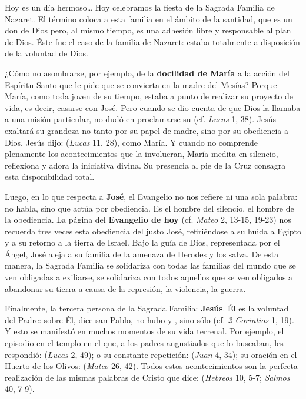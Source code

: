 				\begin{body}
					Hoy es un día hermoso\ldots{} Hoy celebramos la fiesta de la Sagrada Familia de Nazaret. El término  coloca a esta familia en el ámbito de la santidad, que es un don de Dios pero, al mismo tiempo, es una adhesión libre y responsable al plan de Dios. Éste fue el caso de la familia de Nazaret: estaba totalmente a disposición de la voluntad de Dios.
					
					¿Cómo no asombrarse, por ejemplo, de la \textbf{docilidad de María} a la acción del Espíritu Santo que le pide que se convierta en la madre del Mesías? Porque María, como toda joven de su tiempo, estaba a punto de realizar su proyecto de vida, es decir, casarse con José. Pero cuando se dio cuenta de que Dios la llamaba a una misión particular, no dudó en proclamarse su  (cf. \emph{Lucas} 1, 38). Jesús exaltará su grandeza no tanto por su papel de madre, sino por su obediencia a Dios. Jesús dijo:  (\emph{Lucas} 11, 28), como María. Y cuando no comprende plenamente los acontecimientos que la involucran, María medita en silencio, reflexiona y adora la iniciativa divina. Su presencia al pie de la Cruz consagra esta disponibilidad total.
					
					Luego, en lo que respecta a \textbf{José}, el Evangelio no nos refiere ni una sola palabra: no habla, sino que actúa por obediencia. Es el hombre del silencio, el hombre de la obediencia. La página del \textbf{Evangelio de hoy} (cf. \emph{Mateo} 2, 13-15, 19-23) nos recuerda tres veces esta obediencia del justo José, refiriéndose a su huida a Egipto y a su retorno a la tierra de Israel. Bajo la guía de Dios, representada por el Ángel, José aleja a su familia de la amenaza de Herodes y los salva. De esta manera, la Sagrada Familia se solidariza con todas las familias del mundo que se ven obligadas a exiliarse, se solidariza con todos aquellos que se ven obligados a abandonar su tierra a causa de la represión, la violencia, la guerra.
					
					Finalmente, la tercera persona de la Sagrada Familia: \textbf{Jesús}. Él es la voluntad del Padre: sobre Él, dice san Pablo, no hubo  y , sino sólo  (cf. \emph{2 Corintios} 1, 19). Y esto se manifestó en muchos momentos de su vida terrenal. Por ejemplo, el episodio en el templo en el que, a los padres angustiados que lo buscaban, les respondió:  (\emph{Lucas} 2, 49); o su constante repetición:  (\emph{Juan} 4, 34); su oración en el Huerto de los Olivos:  (\emph{Mateo} 26, 42). Todos estos acontecimientos son la perfecta realización de las mismas palabras de Cristo que dice:  (\emph{Hebreos} 10, 5-7; \emph{Salmos} 40, 7-9).
					

\end{body}
